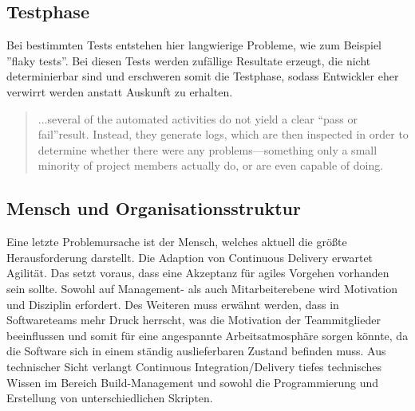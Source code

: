 \subsection{Testphase}

Bei bestimmten Tests entstehen hier langwierige Probleme, wie zum Beispiel ''flaky tests''. Bei diesen Tests werden zufällige Resultate erzeugt, die nicht determinierbar sind und erschweren somit die Testphase, sodass Entwickler eher verwirrt werden anstatt Auskunft zu erhalten. 

\begin{quote}\glqq ...several of the automated activities do not yield a clear “pass or fail”result. Instead, they generate logs, which are then inspected in order to determine whether there were any problems—something only a small minority of project members actually do, or are even capable of doing. \grqq~\cite[S.65]{Laukkanen.2017}\end{quote}
%


\subsection{Mensch und Organisationsstruktur}
Eine letzte Problemursache ist der Mensch, welches aktuell die größte Herausforderung darstellt. Die Adaption von Continuous Delivery erwartet Agilität. Das setzt voraus, dass eine Akzeptanz für agiles Vorgehen vorhanden sein sollte. Sowohl auf Management- als auch Mitarbeiterebene wird Motivation und Disziplin erfordert. Des Weiteren muss erwähnt werden, dass in Softwareteams mehr Druck herrscht, was die Motivation der Teammitglieder beeinflussen und somit für eine angespannte Arbeitsatmosphäre sorgen könnte, da die Software sich in einem ständig auslieferbaren Zustand befinden muss. Aus technischer Sicht verlangt Continuous Integration/Delivery tiefes technisches Wissen im Bereich Build-Management und sowohl die Programmierung und Erstellung von unterschiedlichen Skripten. 